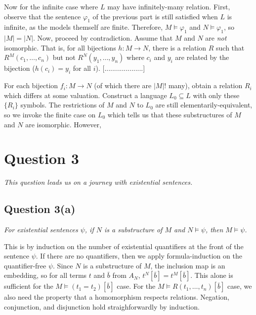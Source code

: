 \documentclass[a4paper]{article}
\begin{document}
Now for the infinite case where $L$
may have infinitely-many relation.
First, observe that the sentence $\varphi_1$
of the previous part is still satisfied when $L$ is infinite,
as the models themself are finite.
Therefore, $M \models \varphi_1$ and $N \models \varphi_1$,
so $|M| = |N|$.
Now, proceed by contradiction.
Assume that $M$ and $N$ are \textit{not} isomorphic.
That is, for all bijections $h : M \to N$,
there is a relation $R$ such that
$R^M(c_1, \ldots, c_n)$ but not $R^N(y_1, \ldots, y_n)$
where $c_i$ and $y_i$ are related by the bijection ($h(c_i) = y_i$ for all $i$).
[....................]

\begin{mdframed}
  For each bijection $f_i : M \to N$ (of which there are $|M|!$ many),
  obtain a relation $R_i$ which differs at some valuation.
  Construct a language $L_0 \subseteq L$ with only these $\{R_i\}$
  symbols.
  The restrictions of $M$ and $N$ to $L_0$ are still elementarily-equivalent,
  so we invoke the finite case on $L_0$ which tells us that these
  substructures of $M$ and $N$ are isomorphic.
  However, 
\end{mdframed}


\section*{Question 3}
\begin{center}
  \textit{This question leads us on a journey with existential sentences.}
\end{center}
\subsection*{Question 3(a)}
\begin{center}
  \textit{For existential sentences $\psi$, if $N$ is a substructure of $M$ and $N \models \psi$, then $M \models \psi$.}
\end{center}
This is by induction on the number of existential quantifiers at the front
of the sentence $\psi$.
If there are no quantifiers, then we apply formula-induction on the quantifier-free $\psi$.
Since $N$ is a substructure of $M$, the inclusion map is an embedding,
so
for all terms $t$ and $\bar b$ from $A_N$, $t^N[\bar b] = t^M[\bar b]$.
This alone is sufficient for the $M \models (t_1 = t_2)[\bar b]$ case.
For the $M \models R(t_1, \ldots, t_n)[\bar b]$ case, we also need the property that
a homomorphism respects relations. 
Negation, conjunction, and disjunction hold straighforwardly by induction.
\end{document}

